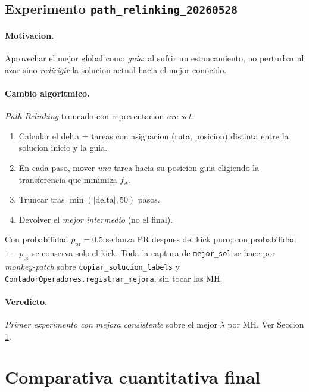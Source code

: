 \documentclass[11pt,a4paper]{article}
\newcommand{\mh}{MH}
\newcommand{\code}[1]{\texttt{#1}}
\begin{document}
\subsection{Experimento \texttt{path\_relinking\_20260528}}

\paragraph{Motivacion.} Aprovechar el mejor global como \emph{guia}:
al sufrir un estancamiento, no perturbar al azar sino \emph{redirigir}
la solucion actual hacia el mejor conocido.

\paragraph{Cambio algoritmico.} \emph{Path Relinking} truncado con
representacion \emph{arc-set}:
\begin{enumerate}
\item Calcular el delta = tareas con asignacion (ruta, posicion)
distinta entre la solucion inicio y la guia.
\item En cada paso, mover \emph{una} tarea hacia su posicion guia
eligiendo la transferencia que minimiza $f_\lambda$.
\item Truncar tras $\min(|\text{delta}|, 50)$ pasos.
\item Devolver el \emph{mejor intermedio} (no el final).
\end{enumerate}
Con probabilidad $p_{\text{pr}}=0.5$ se lanza PR despues del kick puro;
con probabilidad $1-p_{\text{pr}}$ se conserva solo el kick. Toda la
captura de \code{mejor\_sol} se hace por \emph{monkey-patch} sobre
\code{copiar\_solucion\_labels} y
\code{ContadorOperadores.registrar\_mejora}, sin tocar las \mh.

\paragraph{Veredicto.} \emph{Primer experimento con mejora consistente}
sobre el mejor $\lambda$ por \mh. Ver Seccion \ref{sec:comparativa}.

\section{Comparativa cuantitativa final}\label{sec:comparativa}
\end{document}
